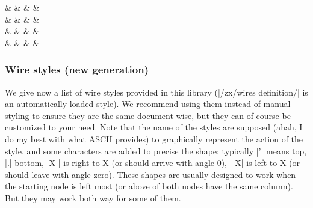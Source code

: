\documentclass[a4paper]{ltxdoc}
\begin{document}
{\begin{codeexample}[width=0pt]
{
  \def\zxDebugMode{}%
  \begin{ZX}[zx row sep=1pt,
    execute at begin picture={%
      \def\Zpifour{\zxFracZ[a=Zpi4]-{\pi}{4}}%
      \def\mypitwo{\zxFracX[a=mypi2]{\pi}{2}}%
    }
    ]
    & \zxN[a=n]{}  & \zxZ[a=xmiddle]{}       &            & \zxN[a=out1]{} \\
    \zxN[a=in1]{} & \Zpifour{}   & \zxX[a=Xdown]{}         & \mypitwo{} &                \\
    &              &                         &            & \zxN[a=out2]{} \\
    \zxN[a=in2]{} & \zxX[a=X1]{} & \zxZ[a=toprightpi]{\pi} &            & \zxN[a=out3]{}
    \ar[from=in1,to=X1,s]
    \ar[from=in2,to=Zpi4,.>]
    \ar[from=X1,to=xmiddle,N']
    \ar[from=X1,to=toprightpi,H]
    \ar[from=Zpi4,to=n,C] \ar[from=n,to=xmiddle,wc]
    \ar[from=Zpi4,to=Xdown]
    \ar[from=xmiddle,to=Xdown,C-]
    \ar[from=xmiddle,to=mypi2,)]
    \ar[from=mypi2,to=toprightpi,(']
    \ar[from=mypi2,to=out1,<']
    \ar[from=mypi2,to=out2,<.]
    \ar[from=Xdown,to=out3,<.]
  \end{ZX}
}
\end{codeexample}

\subsubsection{Wire styles (new generation)}

We give now a list of wire styles provided in this library (|/zx/wires definition/| is an automatically loaded style). We recommend using them instead of manual styling to ensure they are the same document-wise, but they can of course be customized to your need. Note that the name of the styles are supposed (ahah, I do my best with what ASCII provides) to graphically represent the action of the style, and some characters are added to precise the shape: typically |'| means top, |.| bottom, |X-| is right to X (or should arrive with angle 0), |-X| is left to X (or should leave with angle zero). These shapes are usually designed to work when the starting node is left most (or above of both nodes have the same column). But they may work both way for some of them.

}
\end{document}
